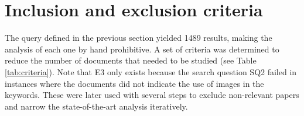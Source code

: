 
\section{Inclusion and exclusion criteria}\label{sec:inclusion_exclusion}
The query defined in the previous section yielded 1489 results, making the analysis of each one by hand prohibitive. A set of criteria was determined to reduce the number of documents that needed to be studied (see Table \ref{tab:criteria}). Note that E3 only exists because the search question SQ2 failed in instances where the documents did not indicate the use of images in the keywords. These were later used with several steps to exclude non-relevant papers and narrow the state-of-the-art analysis iteratively. 

